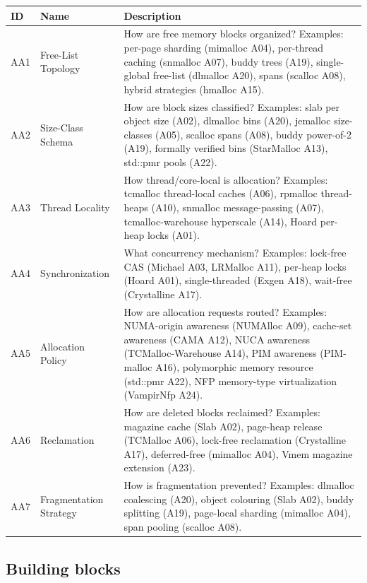 \begin{scriptsize}
\begin{longtable}{@{}>{\raggedright\arraybackslash}p{1.8cm} >{\raggedright\arraybackslash}p{3.2cm} >{\raggedright\arraybackslash}p{8.5cm}@{}}
\toprule
ID & Name & Description \\
\midrule
\endhead%
AA1 & Free-List Topology & How are free memory blocks organized? Examples: per-page sharding (mimalloc A04), per-thread caching (snmalloc A07), buddy trees (A19), single-global free-list (dlmalloc A20), spans (scalloc A08), hybrid strategies (hmalloc A15). \\
AA2 & Size-Class Schema & How are block sizes classified? Examples: slab per object size (A02), dlmalloc bins (A20), jemalloc size-classes (A05), scalloc spans (A08), buddy power-of-2 (A19), formally verified bins (Star\allowbreak{}Malloc A13), std::pmr pools (A22). \\
AA3 & Thread Locality & How thread/\allowbreak{}core-local is allocation? Examples: tcmalloc thread-local caches (A06), rpmalloc thread-heaps (A10), snmalloc message-passing (A07), tcmalloc-warehouse hyperscale (A14), Hoard per-heap locks (A01). \\
AA4 & Synchronization & What concurrency mechanism? Examples: lock-free CAS (Michael A03, LRMalloc A11), per-heap locks (Hoard A01), single-threaded (Exgen A18), wait-free (Crystalline A17). \\
AA5 & Allocation Policy & How are allocation requests routed? Examples: NUMA-origin awareness (NUMAlloc A09), cache-set awareness (CAMA A12), NUCA awareness (TCMalloc-Warehouse A14), PIM awareness (PIM-malloc A16), polymorphic memory resource (std::pmr A22), NFP memory-type virtualization (Vampir\allowbreak{}Nfp A24). \\
AA6 & Reclamation & How are deleted blocks reclaimed? Examples: magazine cache (Slab A02), page-heap release (TCMalloc A06), lock-free reclamation (Crystalline A17), deferred-free (mimalloc A04), Vmem magazine extension (A23). \\
AA7 & Fragmentation Strategy & How is fragmentation prevented? Examples: dlmalloc coalescing (A20), object colouring (Slab A02), buddy splitting (A19), page-local sharding (mimalloc A04), span pooling (scalloc A08). \\
\bottomrule
\end{longtable}
\end{scriptsize}

\subsection*{Building blocks}

